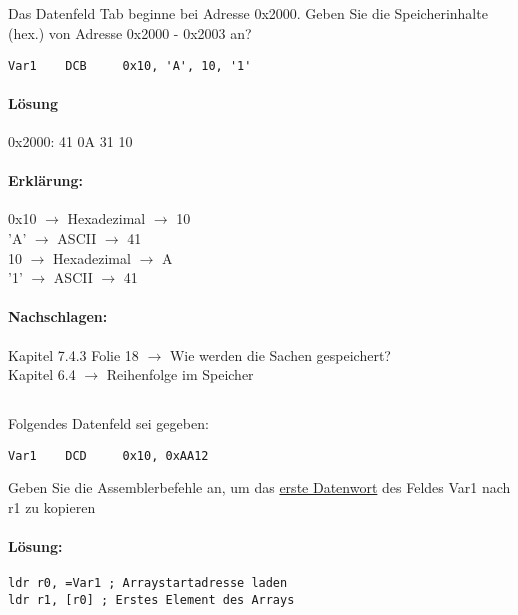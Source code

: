 \subsection{}
Das Datenfeld Tab beginne bei Adresse 0x2000. Geben Sie die Speicherinhalte (hex.) von Adresse 0x2000 - 0x2003 an?\\
\begin{lstlisting}
Var1 	DCB 	0x10, 'A', 10, '1'
\end{lstlisting}

\paragraph*{Lösung}
0x2000: 41 0A 31 10 \\


\paragraph*{Erklärung:}
0x10 $\rightarrow$ Hexadezimal $\rightarrow$ 10\\
'A' $\rightarrow$ ASCII $\rightarrow$ 41\\
10 $\rightarrow$ Hexadezimal $\rightarrow$ A\\
'1' $\rightarrow$ ASCII $\rightarrow$ 41\\

\paragraph*{Nachschlagen:}
Kapitel 7.4.3 Folie 18 $\rightarrow$ Wie werden die Sachen gespeichert?\\
Kapitel 6.4 $\rightarrow$ Reihenfolge im Speicher\\

\subsection{}
Folgendes Datenfeld sei gegeben:
\begin{lstlisting}
Var1 	DCD 	0x10, 0xAA12
\end{lstlisting}
Geben Sie die Assemblerbefehle an, um das \underline{erste Datenwort} des Feldes Var1 nach r1 zu kopieren

\paragraph*{Lösung:}
\begin{lstlisting}
ldr r0, =Var1 ; Arraystartadresse laden 
ldr r1, [r0] ; Erstes Element des Arrays
\end{lstlisting}
